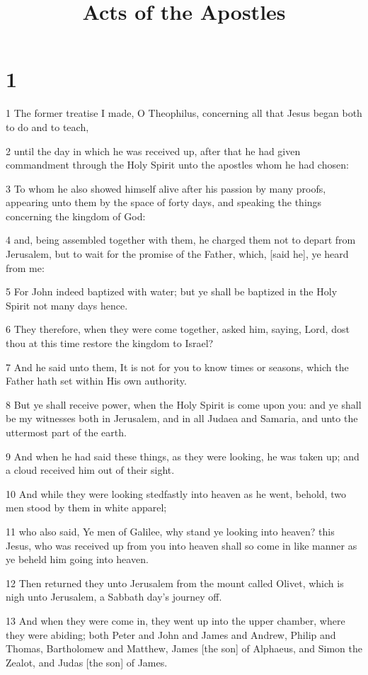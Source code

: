 

\title{Acts of the Apostles}

\chapter{1}

\par 1 The former treatise I made, O Theophilus, concerning all that Jesus began both to do and to teach,
\par 2 until the day in which he was received up, after that he had given commandment through the Holy Spirit unto the apostles whom he had chosen:
\par 3 To whom he also showed himself alive after his passion by many proofs, appearing unto them by the space of forty days, and speaking the things concerning the kingdom of God:
\par 4 and, being assembled together with them, he charged them not to depart from Jerusalem, but to wait for the promise of the Father, which, [said he], ye heard from me:
\par 5 For John indeed baptized with water; but ye shall be baptized in the Holy Spirit not many days hence.
\par 6 They therefore, when they were come together, asked him, saying, Lord, dost thou at this time restore the kingdom to Israel?
\par 7 And he said unto them, It is not for you to know times or seasons, which the Father hath set within His own authority.
\par 8 But ye shall receive power, when the Holy Spirit is come upon you: and ye shall be my witnesses both in Jerusalem, and in all Judaea and Samaria, and unto the uttermost part of the earth.
\par 9 And when he had said these things, as they were looking, he was taken up; and a cloud received him out of their sight.
\par 10 And while they were looking stedfastly into heaven as he went, behold, two men stood by them in white apparel;
\par 11 who also said, Ye men of Galilee, why stand ye looking into heaven? this Jesus, who was received up from you into heaven shall so come in like manner as ye beheld him going into heaven.
\par 12 Then returned they unto Jerusalem from the mount called Olivet, which is nigh unto Jerusalem, a Sabbath day's journey off.
\par 13 And when they were come in, they went up into the upper chamber, where they were abiding; both Peter and John and James and Andrew, Philip and Thomas, Bartholomew and Matthew, James [the son] of Alphaeus, and Simon the Zealot, and Judas [the son] of James.
